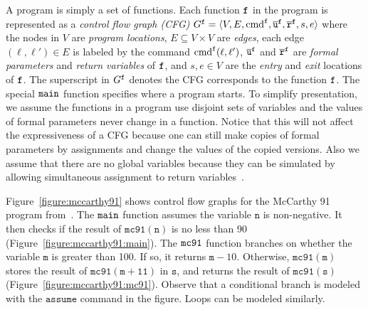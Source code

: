A program  is simply a set of functions.
Each function $\mathtt{{f}}$ in the program  is represented as a
\emph{control flow graph (CFG)} $G^{\mathtt{{f}}} = \langle V, E, \textup{\textmd{{cmd}}}^{\mathtt{{f}}},
\overline{\mathtt{u}}^{\mathtt{{f}}}, \overline{\mathtt{r}}^{\mathtt{{f}}}, s, e \rangle$
where the nodes in $V$ are \emph{program locations}, $E \subseteq V \times V$
are \emph{edges},
each edge $(\ell, \ell') \in E$ is labeled by the command $\textup{\textmd{{cmd}}}^{\mathtt{{f}}}
(\ell, \ell')$,
$\overline{\mathtt{u}}^{\mathtt{{f}}}$ and $\overline{\mathtt{r}}^{\mathtt{{f}}}$ are
\emph{formal parameters} and \emph{return variables} of $\mathtt{{f}}$,
and $s,  e \in V$ are the \emph{entry} and \emph{exit} locations of $\mathtt{{f}}$.
The superscript in $G^{\mathtt{{f}}}$ denotes the CFG corresponds to the function
$\mathtt{{f}}$.
The special $\mathtt{{main}}$ function specifies where a program starts.
To simplify presentation, we assume the functions in a program use disjoint sets
of variables and the values of formal parameters never change in a function.
Notice that this will not affect the expressiveness of a CFG because one can
still make copies of formal parameters by assignments and change the values of
the copied versions.
Also we assume that there are no global variables because they can be simulated
by allowing simultaneous assignment to return variables~\cite{BallR00}.

Figure~\ref{figure:mccarthy91} shows control flow graphs for the
McCarthy 91 program from~\cite{MannaP70}. The $\mathtt{{main}}$ function assumes the
variable $\mathtt{n}$ is non-negative.
It then checks if the result of $\mathtt{mc91(n)}$ is no less than 90
(Figure~\ref{figure:mccarthy91:main}).
The $\mathtt{{mc91}}$ function branches on whether the variable $\mathtt{m}$ is
greater than 100.
If so, it returns $\mathtt{m} - 10$.
Otherwise, $\mathtt{mc91(m)}$ stores the result of $\mathtt{mc91(m + 11)}$
in $\mathtt{s}$,
and returns the result of $\mathtt{mc91(s)}$
(Figure~\ref{figure:mccarthy91:mc91}).
Observe that a conditional branch is modeled with the $\mathtt{assume}$ command
in the figure. Loops can be modeled similarly.

